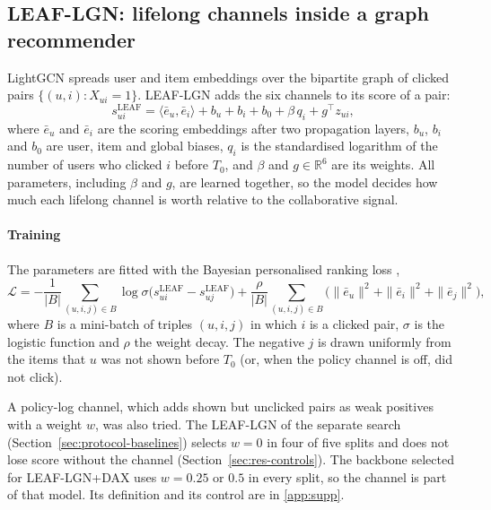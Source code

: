 \subsection{LEAF-LGN: lifelong channels inside a graph recommender}
\label{sec:method-leaflgn}

LightGCN \citep{he2020lightgcn} spreads user and item embeddings over the bipartite graph of clicked pairs $\{(u,i):X_{ui}=1\}$. LEAF-LGN adds
the six channels to its score of a pair:
\begin{equation}
  s^{\mathrm{LEAF}}_{ui}=\langle\bar e_u,\bar e_i\rangle+b_u+b_i+b_0+\beta\,q_i+g^{\top}z_{ui},
  \label{eq:leaflgn}
\end{equation}
where $\bar e_u$ and $\bar e_i$ are the scoring embeddings after two propagation layers, $b_u$, $b_i$ and $b_0$ are user, item and global
biases, $q_i$ is the standardised logarithm of the number of users who clicked $i$ before $T_0$, and $\beta$ and $g\in\mathbb R^6$ are its
weights. All parameters, including $\beta$ and $g$, are learned together, so the model decides how much each lifelong channel is worth
relative to the collaborative signal.

\paragraph{Training} The parameters are fitted with the Bayesian personalised ranking loss \citep{rendle2009bpr},
\begin{equation}
  \mathcal L=-\frac{1}{|B|}\sum_{(u,i,j)\in B}\log\sigma\bigl(s^{\mathrm{LEAF}}_{ui}-s^{\mathrm{LEAF}}_{uj}\bigr)
  +\frac{\rho}{|B|}\sum_{(u,i,j)\in B}\bigl(\|\bar e_u\|^2+\|\bar e_i\|^2+\|\bar e_j\|^2\bigr),
  \label{eq:bpr}
\end{equation}
where $B$ is a mini-batch of triples $(u,i,j)$ in which $i$ is a clicked pair, $\sigma$ is the logistic function and $\rho$ the weight
decay. The negative $j$ is drawn uniformly from the items that $u$ was not shown before $T_0$ (or, when the policy channel is off, did not click).

A policy-log channel, which adds shown but unclicked pairs as weak positives with a weight $w$, was also tried. The LEAF-LGN of the separate search (Section~\ref{sec:protocol-baselines}) selects $w=0$ in four of five splits and
does not lose score without the channel (Section~\ref{sec:res-controls}). The backbone selected for LEAF-LGN+DAX uses $w=0.25$ or
$0.5$ in every split, so the channel is part of that model. Its definition and
its control are in \ref{app:supp}.

